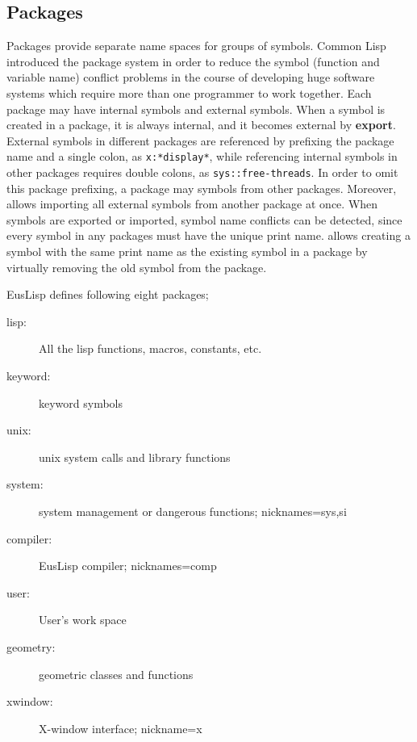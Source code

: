 \begin{refdesc}

\end{refdesc}

\subsection{Packages}

Packages provide separate name spaces for groups of symbols.
Common Lisp introduced the package system in order to reduce the
symbol (function and variable name) conflict problems 
in the course of developing huge software systems
which require more than one programmer to work together.
Each package may have internal symbols and external symbols.
When a symbol is created in a package, it is always internal,
and it becomes external by {\bf export}. External symbols in different
packages are referenced by prefixing the package name and a single colon,
as {\tt x:*display*}, while referencing internal symbols in other packages
requires double colons, as {\tt sys::free-threads}.
In order to omit this package prefixing, a package may  symbols
from other packages.
Moreover,  allows importing all external symbols
from another package at once.
When symbols are exported or imported, symbol name conflicts can be detected,
since every symbol in any packages must have the unique print name.
 allows creating a symbol with the same print name as the
existing symbol in a package by virtually removing the old symbol from 
the package.

EusLisp defines following eight packages;
\begin{description}
\item [lisp:] All the lisp functions, macros, constants, etc.
\item [keyword:] keyword symbols 
\item [unix:] unix system calls and library functions
\item [system:] system management or dangerous functions; nicknames=sys,si
\item [compiler:] EusLisp compiler; nicknames=comp
\item [user:] User's work space
\item [geometry:] geometric classes and functions
\item [xwindow:] X-window interface; nickname=x
\end{description}

